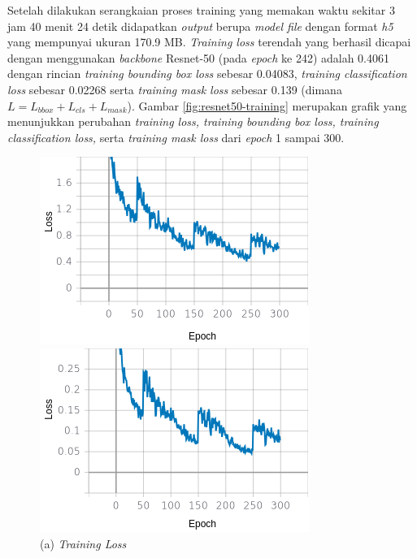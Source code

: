 Setelah dilakukan serangkaian proses training yang memakan waktu sekitar 3 jam 40 menit 24 detik didapatkan \textit{output} berupa \textit{model file}  dengan format \textit{h5} yang mempunyai ukuran 170.9 MB. \textit{Training loss} terendah yang berhasil dicapai dengan menggunakan \textit{backbone} Resnet-50 (pada \textit{epoch} ke 242) adalah 0.4061 dengan rincian \textit{training bounding box loss} sebesar 0.04083, \textit{training classification loss} sebesar 0.02268 serta \textit{training mask loss} sebesar 0.139 (dimana $L=L_{bbox}+L_{cls}+L_{mask}$). Gambar \ref{fig:resnet50-training} merupakan grafik yang menunjukkan perubahan \textit{training loss, training bounding box loss, training classification loss,} serta \textit{training mask loss} dari \textit{epoch} 1 sampai 300.

\begin{figure}[H]
	\centering
	\begin{minipage}{0.45\textwidth}
		\includegraphics[width=\textwidth]{gambar/training_resnet50/tugas-akhir-Page-12.png}
		\caption*{(a) \textit{Training Loss}}
	\end{minipage}
	\hfill
	\begin{minipage}{0.45\textwidth}
		\includegraphics[width=\textwidth]{gambar/training_resnet50/tugas-akhir-Page-12-(1).png}

\end{minipage}
\end{figure}
